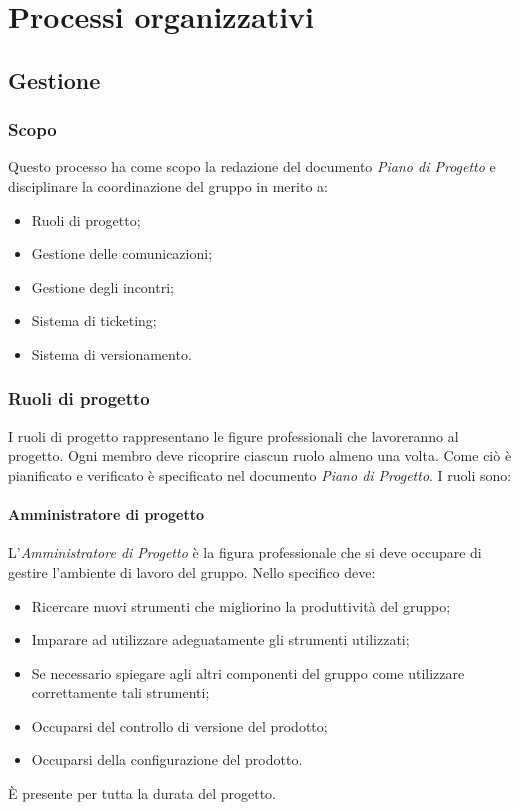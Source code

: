 \section{Processi organizzativi}
\label{sec:processiorganizzativi}

\subsection{Gestione}

\subsubsection{Scopo}
Questo processo ha come scopo la redazione del documento \emph{Piano di Progetto} e disciplinare la coordinazione del gruppo in merito a:
\begin{itemize}
	\item Ruoli di progetto;
	\item Gestione delle comunicazioni;
	\item Gestione degli incontri;
	\item Sistema di ticketing;
	\item Sistema di versionamento.

\end{itemize}
\subsubsection{Ruoli di progetto}
I ruoli di progetto rappresentano le figure professionali che lavoreranno al progetto.  Ogni membro deve ricoprire ciascun ruolo almeno una volta. Come ciò è pianificato e verificato è specificato nel documento \emph{Piano di Progetto}. I ruoli sono:
\paragraph{Amministratore di progetto} \Spazio
L'\emph{Amministratore di Progetto} è la figura professionale che si deve occupare di gestire l'ambiente di lavoro del gruppo. Nello specifico deve:
\begin{itemize}
	\item Ricercare nuovi strumenti che migliorino la produttività del gruppo;
	\item Imparare ad utilizzare adeguatamente gli strumenti utilizzati;
	\item Se necessario spiegare agli altri componenti del gruppo come utilizzare correttamente tali strumenti;
	\item Occuparsi del controllo di versione del prodotto;
	\item Occuparsi della configurazione del prodotto.
\end{itemize}
È presente per tutta la durata del progetto.
